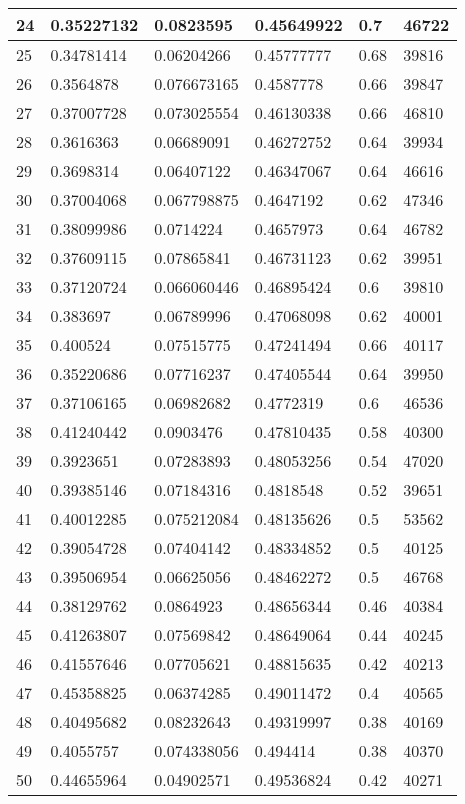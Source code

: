 \begin{longtable}{|l|l|l|l|l|l|}
24 & 0.35227132 & 0.0823595 & 0.45649922 & 0.7 & 46722 \\ \hline 
25 & 0.34781414 & 0.06204266 & 0.45777777 & 0.68 & 39816 \\ \hline 
26 & 0.3564878 & 0.076673165 & 0.4587778 & 0.66 & 39847 \\ \hline 
27 & 0.37007728 & 0.073025554 & 0.46130338 & 0.66 & 46810 \\ \hline 
28 & 0.3616363 & 0.06689091 & 0.46272752 & 0.64 & 39934 \\ \hline 
29 & 0.3698314 & 0.06407122 & 0.46347067 & 0.64 & 46616 \\ \hline 
30 & 0.37004068 & 0.067798875 & 0.4647192 & 0.62 & 47346 \\ \hline 
31 & 0.38099986 & 0.0714224 & 0.4657973 & 0.64 & 46782 \\ \hline 
32 & 0.37609115 & 0.07865841 & 0.46731123 & 0.62 & 39951 \\ \hline 
33 & 0.37120724 & 0.066060446 & 0.46895424 & 0.6 & 39810 \\ \hline 
34 & 0.383697 & 0.06789996 & 0.47068098 & 0.62 & 40001 \\ \hline 
35 & 0.400524 & 0.07515775 & 0.47241494 & 0.66 & 40117 \\ \hline 
36 & 0.35220686 & 0.07716237 & 0.47405544 & 0.64 & 39950 \\ \hline 
37 & 0.37106165 & 0.06982682 & 0.4772319 & 0.6 & 46536 \\ \hline 
38 & 0.41240442 & 0.0903476 & 0.47810435 & 0.58 & 40300 \\ \hline 
39 & 0.3923651 & 0.07283893 & 0.48053256 & 0.54 & 47020 \\ \hline 
40 & 0.39385146 & 0.07184316 & 0.4818548 & 0.52 & 39651 \\ \hline 
41 & 0.40012285 & 0.075212084 & 0.48135626 & 0.5 & 53562 \\ \hline 
42 & 0.39054728 & 0.07404142 & 0.48334852 & 0.5 & 40125 \\ \hline 
43 & 0.39506954 & 0.06625056 & 0.48462272 & 0.5 & 46768 \\ \hline 
44 & 0.38129762 & 0.0864923 & 0.48656344 & 0.46 & 40384 \\ \hline 
45 & 0.41263807 & 0.07569842 & 0.48649064 & 0.44 & 40245 \\ \hline 
46 & 0.41557646 & 0.07705621 & 0.48815635 & 0.42 & 40213 \\ \hline 
47 & 0.45358825 & 0.06374285 & 0.49011472 & 0.4 & 40565 \\ \hline 
48 & 0.40495682 & 0.08232643 & 0.49319997 & 0.38 & 40169 \\ \hline 
49 & 0.4055757 & 0.074338056 & 0.494414 & 0.38 & 40370 \\ \hline 
50 & 0.44655964 & 0.04902571 & 0.49536824 & 0.42 & 40271 \\ \hline 
\end{longtable}